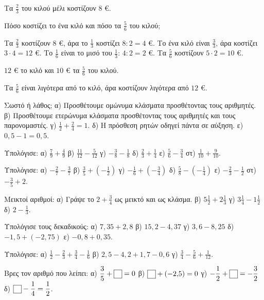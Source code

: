 \tixero Τα $\frac{2}{3}$ του κιλού μέλι κοστίζουν $8$ €.\par
\tithelo Πόσο κοστίζει το ένα κιλό και πόσο τα $\frac{5}{6}$ του κιλού;\par
\possindeo Τα $\frac{2}{3}$ κοστίζουν $8$ €, άρα το $\frac{1}{3}$ κοστίζει $8:2=4$ €. Το ένα κιλό είναι $\frac{3}{3}$, άρα κοστίζει $3\cdot4=12$ €. Το $\frac{1}{6}$ είναι το μισό του $\frac{1}{3}$: $4:2=2$ €. Τα $\frac{5}{6}$ κοστίζουν $5\cdot2=10$ €.\par
\apantisi $12$ € το κιλό και $10$ € τα $\frac{5}{6}$ του κιλού.\par
\elegxos Τα $\frac{5}{6}$ είναι λιγότερα από το κιλό, άρα κοστίζουν λιγότερα από $12$ €.



\ex Σωστό ή λάθος; α) Προσθέτουμε ομώνυμα κλάσματα προσθέτοντας τους αριθμητές. \quad β) Προσθέτουμε ετερώνυμα κλάσματα προσθέτοντας τους αριθμητές και τους παρονομαστές. \quad γ) $\frac{1}{2}+\frac{2}{4}=1$. \quad δ) Η πρόσθεση ρητών οδηγεί πάντα σε αύξηση. \quad ε) $0{,}5-1=0{,}5$.

\ex Υπολόγισε: α) $\frac{7}{9}+\frac{4}{9}$ \quad β) $\frac{11}{12}-\frac{5}{12}$ \quad γ) $-\frac{3}{8}-\frac{1}{8}$ \quad δ) $\frac{2}{3}+\frac{1}{4}$ \quad ε) $\frac{5}{6}-\frac{3}{4}$ \quad στ) $\frac{1}{10}+\frac{9}{10}$.

\ex Υπολόγισε: α) $-\frac{2}{7}-\frac{3}{7}$ \quad β) $\frac{3}{5}+\left(-\frac{1}{2}\right)$ \quad γ) $-\frac{1}{6}+\left(-\frac{3}{4}\right)$ \quad δ) $\frac{5}{8}-\left(-\frac{1}{4}\right)$ \quad ε) $-\frac{2}{3}-\frac{1}{2}$ \quad στ) $-\frac{3}{5}+2$.

\ex Μεικτοί αριθμοί: α) Γράψε το $2+\frac{3}{4}$ ως μεικτό και ως κλάσμα. β) $5\frac{1}{2}+2\frac{1}{3}$ \quad γ) $3\frac{1}{4}-1\frac{1}{2}$ \quad δ) $2-\frac{1}{3}$.

\ex Υπολόγισε τους δεκαδικούς: α) $7{,}35+2{,}8$ \quad β) $15{,}2-4{,}37$ \quad γ) $3{,}6-8{,}25$ \quad δ) $-1{,}5+(-2{,}75)$ \quad ε) $-0{,}8+0{,}35$.

\ex Υπολόγισε: α) $\frac{1}{2}-\frac{2}{3}+\frac{3}{4}-\frac{1}{6}$ \quad β) $2{,}5-4{,}2+1{,}7-0{,}6$ \quad γ) $\frac{3}{4}-\frac{5}{6}+\frac{1}{12}$.

\ex Βρες τον αριθμό που λείπει: α) $\frac{3}{5}+\kouti=0$ \quad β) $\kouti+(-2{,}5)=0$ \quad γ) $-\frac{1}{2}+\kouti=-\frac{3}{2}$ \quad δ) $\kouti-\frac{1}{4}=\frac{1}{2}$.

